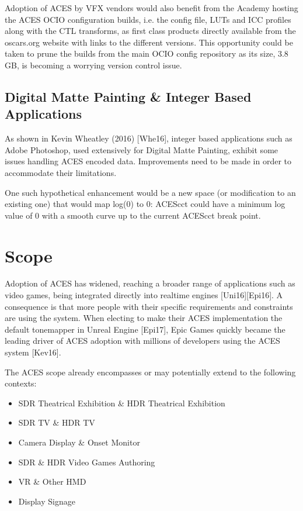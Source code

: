 \documentclass[conference]{IEEEtran}
\begin{document}
Adoption of ACES by VFX vendors would also benefit from the Academy hosting the ACES OCIO configuration builds, i.e. the config file, LUTs and ICC profiles along with the CTL transforms, as first class products directly available from the oscars.org website with links to the different versions. This opportunity could be taken to prune the builds from the main OCIO config repository as its size, 3.8 GB, is becoming a worrying version control issue.

\subsection{Digital Matte Painting \& Integer Based Applications}
As shown in Kevin Wheatley (2016) [Whe16], integer based applications such as Adobe Photoshop, used extensively for Digital Matte Painting, exhibit some issues handling ACES encoded data. Improvements need to be made in order to accommodate their limitations.

One such hypothetical enhancement would be a new space (or modification to an existing one) that would map log(0) to 0: ACEScct could have a minimum log value of 0 with a smooth curve up to the current ACEScct break point.

\section{Scope}
Adoption of ACES has widened, reaching a broader range of applications such as video games, being integrated directly into realtime engines [Uni16][Epi16]. A consequence is that more people with their specific requirements and constraints are using the system. When electing to make their ACES implementation the default tonemapper in Unreal Engine [Epi17], Epic Games quickly became the leading driver of ACES adoption with millions of developers using the ACES system [Kev16].

The ACES scope already encompasses or may potentially extend to the following contexts:
\begin{itemize}
	\item SDR Theatrical Exhibition \& HDR Theatrical Exhibition
	\item SDR TV \& HDR TV
	\item Camera Display \& Onset Monitor
	\item SDR \& HDR Video Games Authoring
	\item VR \& Other HMD
	\item Display Signage
\end{itemize}
\end{document}

